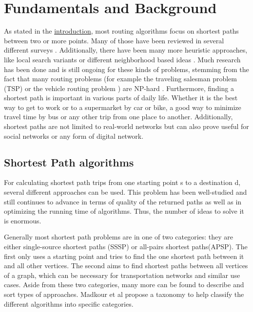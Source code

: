 \chapter{Fundamentals and Background}
\label{chapter:fundamentals}

As stated in the \href{chapter:introduction}{introduction}, most routing algorithms focus on shortest paths between two or more points.
Many of those have been reviewed in several different surveys \cite{madkour_survey_2017, wayahdi_greedy_2021}.
Additionally, there have been many more heuristic approaches, like local search variants \cite{braysy_vehicle_2005, irnich_sequential_2006, ropke_heuristic_2005} or different neighborhood based ideas \cite{braysy_vehicle_2005, irnich_sequential_2006, ropke_heuristic_2005}.
Much research has been done and is still ongoing for these kinds of problems, stemming from the fact that many routing problems (for example the traveling salesman problem (TSP) \cite{gendreau_handbook_2010} or the vehicle routing problem \cite{braysy_vehicle_2005, irnich_sequential_2006}) are NP-hard \cite{reinelt_traveling_2003}. 
Furthermore, finding a shortest path is important in various parts of daily life.
Whether it is the best way to get to work or to a supermarket by car or bike, a good way to minimize travel time by bus or any other trip from one place to another.
Additionally, shortest paths are not limited to real-world networks but can also prove useful for social networks or any form of digital network. \cite{madkour_survey_2017}

\section{Shortest Path algorithms}
\label{sec:shortestPath}

For calculating shortest path trips from one starting point s to a destination d, several different approaches can be used.
This problem has been well-studied and still continues to advance in terms of quality of the returned paths as well as in optimizing the running time of algorithms.
Thus, the number of ideas to solve it is enormous. 

Generally most shortest path problems are in one of two categories: they are either single-source shortest paths (SSSP) or all-pairs shortest paths(APSP).
The first only uses a starting point and tries to find the one shortest path between it and all other vertices.
The second aims to find shortest paths between all vertices of a graph, which can be necessary for transportation networks and similar use cases. 
Aside from these two categories, many more can be found to describe and sort types of approaches. 
Madkour et al propose a taxonomy to help classify the different algorithms into specific categories. \cite{madkour_survey_2017} 

